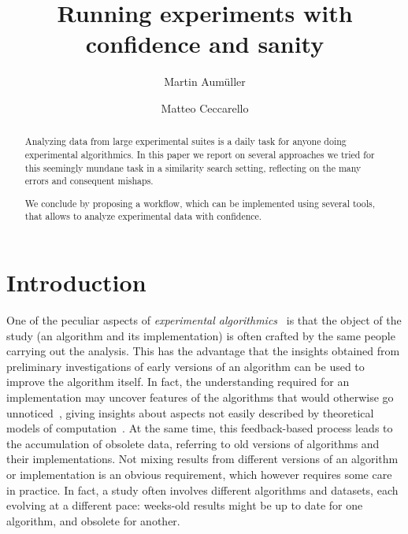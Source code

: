\documentclass{llncs}
\begin{document}
\title{Running experiments with confidence and sanity}
%
%
\author{
  Martin Aumüller%
  \and
  Matteo Ceccarello%
  }
%
%
%
\maketitle              %
%
\begin{abstract}
Analyzing data from large experimental suites is a daily task for
anyone doing experimental algorithmics.
In this paper we report on several approaches we tried for this 
seemingly mundane task in a similarity search setting, reflecting on the many errors and consequent
mishaps.

We conclude by proposing a workflow, which can be implemented using several
tools, that allows to analyze experimental data with confidence.

\end{abstract}

\section{Introduction}

One of the peculiar aspects of \emph{experimental algorithmics}~\cite{DBLP:journals/jucs/MoretS01}
is that the object of the study (an algorithm and its implementation)
is often crafted by the same people carrying out the analysis.
This has the advantage that the insights obtained from preliminary
investigations of early versions of an algorithm can be used to improve the
algorithm itself.
In fact,
the understanding required for an implementation may uncover features of the
algorithms that would otherwise go unnoticed~\cite{DBLP:journals/jucs/MoretS01}, giving
insights about aspects not easily described by theoretical
models of computation~\cite{DBLP:journals/cacm/McGeoch07}.
At the same time, this feedback-based process leads to the
accumulation of obsolete data, referring to old versions of
algorithms and their implementations.
Not mixing results from different versions of
an algorithm or implementation is an obvious requirement, which
however requires some care in practice.
In fact, a study often involves different algorithms and datasets,
each evolving at a different pace: weeks-old results might be up to date
for one algorithm, and obsolete for another.
\end{document}
